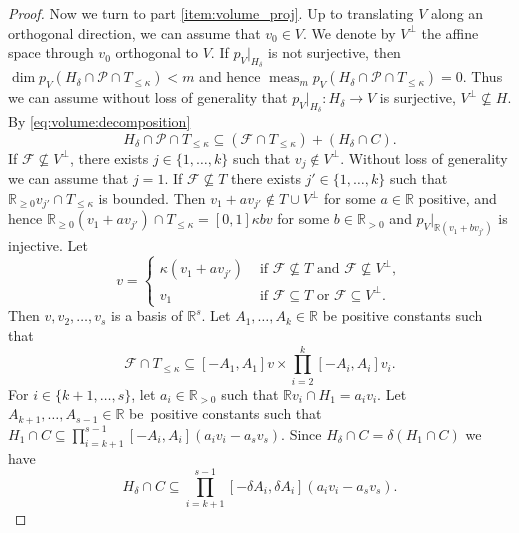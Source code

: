 \documentclass[JEP,XML,SOM,Unicode,published]{cedram}
\newcommand\RR{\mathbb{R}}
\DeclareMathOperator{\meas}{meas}
\theoremstyle{definition}
\numberwithin{theorem}{section}
\begin{document}
\begin{proof}
Now we turn to part \eqref{item:volume_proj}. Up to translating $V$ along an orthogonal direction, we can assume that $v_0\in V$. We denote by $V^{\perp}$ the affine space through $v_0$ orthogonal to $V$.
If $p_V|_{H_\delta}$ is not surjective, then $\dim p_V(H_\delta\cap\mathcal P\cap T_{\leq\kappa})<m$ and hence \hbox{$\meas_mp_V(H_\delta\cap\mathcal P\cap T_{\leq \kappa})=0$}. Thus we can assume without loss of generality that $p_V|_{H_\delta}: H_\delta\to V$ is surjective, \ie $V^{\perp}\nsubseteq H$.
By \eqref{eq:volume:decomposition}
\[
H_\delta\cap\mathcal P\cap T_{\leq \kappa}\subseteq (\mathcal F\cap T_{\leq\kappa})+(H_\delta\cap C).
\]
If $\mathcal F\nsubseteq V^{\perp}$, there exists $j\in\{1,\dots,k\}$ such that $v_{j}\notin V^{\perp}$. Without loss of generality we can assume that $j=1$.
If $\mathcal F\nsubseteq T$ there exists $j'\in\{1,\dots,k\}$ such that \hbox{$\RR_{\geq 0}v_{j'}\cap T_{\leq \kappa}$} is bounded. Then $v_1+a v_{j'}\notin T\cup V^{\perp}$ for some $a\in\RR$ positive, and hence \hbox{$\RR_{\geq 0}(v_1+av_{j'})\cap T_{\leq \kappa}=[0,1]\kappa b v$} for some $b\in\RR_{> 0}$ and $p_V|_{\RR (v_1+bv_{j'})}$ is injective.
Let \[
v=\begin{cases}
\kappa(v_1+av_{j'}) & \text{ if } \mathcal F\nsubseteq T \text{ and } \mathcal F\nsubseteq V^{\perp}, \\
v_1 & \text{ if }\mathcal F\subseteq T \text{ or } \mathcal F\subseteq V^{\perp}.
\end{cases}
\]
Then $v, v_2,\dots,v_s$ is a basis of $\RR^s$. Let $A_1,\dots,A_k\in\RR$ be positive constants such that
\begin{equation*}\label{eq:volume:projF}
\mathcal F\cap T_{\leq\kappa}\subseteq [- A_1, A_1] v\times \prod_{i=2}^k[-A_i, A_i]v_i.
\end{equation*}
For $i\!\in\!\{k+1,\dots,s\}$, let $a_i\!\in\!\RR_{>0}$ such that $\RR v_i\cap H_1=a_iv_i$. Let $A_{k+1},\dots,A_{s-1}\!\in\!\RR$ be~positive constants such that $H_1\cap C\subseteq \prod_{i=k+1}^{s-1}[-A_i, A_i](a_iv_i-a_sv_s)$.
Since $H_{\delta}\cap C=\delta(H_1\cap C)$ we have
\[
H_{\delta}\cap C\subseteq \prod_{i=k+1}^{s-1}[-\delta A_i, \delta A_i](a_iv_i-a_sv_s).
\]


\end{proof}
\end{document}
